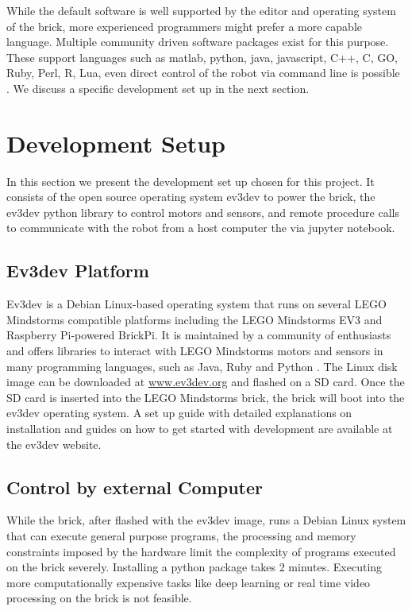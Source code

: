 \documentclass[11pt, a4paper]{article}
\begin{document}
While the default software is well supported by the editor and operating system of the brick, more experienced programmers might prefer a more capable language. Multiple community driven software packages exist for this purpose. These support languages such as matlab, python, java, javascript, C++, C, GO, Ruby, Perl, R, Lua, even direct control of the robot via command line is possible \cite{ev3dev}. We discuss a specific development set up in the next section.



\section{Development Setup}
In this section we present the development set up chosen for this project. It consists of the open source operating system ev3dev to power the brick, the ev3dev python library to control motors and sensors, and remote procedure calls to communicate with the robot from a host computer the via jupyter notebook.

\subsection{Ev3dev Platform}
Ev3dev is a Debian Linux-based operating system that runs on several LEGO Mindstorms compatible platforms including the LEGO Mindstorms EV3 and Raspberry Pi-powered BrickPi. It is maintained by a community of enthusiasts and offers libraries to interact with LEGO Mindstorms motors and sensors in many programming languages, such as Java, Ruby and Python \cite{ev3dev}. The Linux disk image can be downloaded at \href{https://www.ev3dev.org/}{www.ev3dev.org} and flashed on a SD card. Once the SD card is inserted into the LEGO Mindstorms brick, the brick will boot into the ev3dev operating system. A set up guide with detailed explanations on installation and guides on how to get started with development are available at the ev3dev website.

\subsection{Control by external Computer}
While the brick, after flashed with the ev3dev image, runs a Debian Linux system that can execute general purpose programs, the processing and memory constraints imposed by the hardware limit the complexity of programs executed on the brick severely. Installing a python package takes 2 minutes. Executing more computationally expensive tasks like deep learning or real time video processing on the brick is not feasible.
\end{document}

